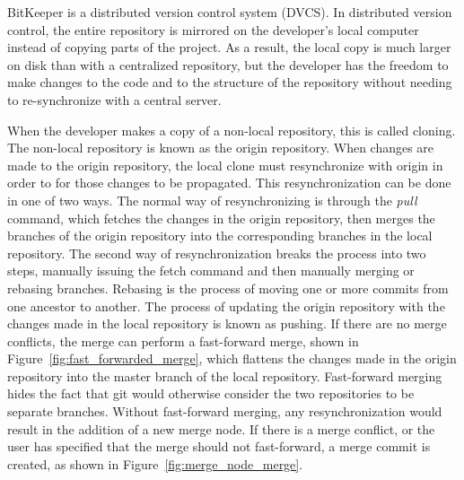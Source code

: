 BitKeeper is a distributed version control system (DVCS).
In distributed version control, the entire repository is mirrored on
the developer's local computer instead of copying parts of the project.
As a result, the local copy is much larger on disk than with a
centralized repository, but the developer has the freedom to make
changes to the code and to the
structure of the repository without needing to re-synchronize with a
central server.

When the developer makes a copy of a non-local repository, this is
called cloning.
The non-local repository is known as the origin repository.
When changes are made to the origin repository, the local clone must
resynchronize with origin in order to for those changes to be propagated.
This resynchronization can be done in one of two ways.
The normal way of resynchronizing is through the \textit{pull} command,
which fetches the changes in the origin repository, then merges the
branches of the origin repository into the corresponding branches in the
local repository.
The second way of resynchronization breaks the process into two steps,
manually issuing the fetch command and then manually merging or rebasing
branches.
Rebasing is the process of moving one or more commits from one ancestor
to another.
The process of updating the origin repository with the changes made in
the local repository is known as pushing.
If there are no merge conflicts, the merge can perform a fast-forward
merge, shown in Figure~\ref{fig:fast_forwarded_merge},
which flattens the changes made in the origin repository into the
master branch of the local repository.
Fast-forward merging hides the fact that git would otherwise consider
the two repositories to be separate branches.
Without fast-forward merging, any resynchronization would result in the
addition of a new merge node.
If there is a merge conflict, or the user has specified that the merge
should not fast-forward, a merge commit is created, as shown in
Figure~\ref{fig:merge_node_merge}.

